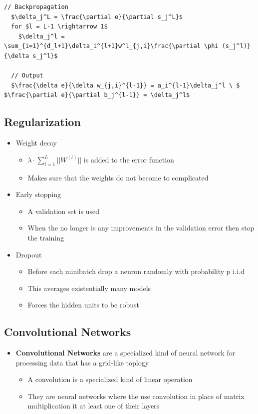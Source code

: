 \documentclass[a4, english]{article}
\begin{document}
\begin{itemize}
\begin{lstlisting}[mathescape=true]
  // Backpropagation 
  $\delta_j^L = \frac{\partial e}{\partial s_j^L}$
  for $l = L-1 \rightarrow 1$ 
    $\delta_j^l = \sum_{i=1}^{d_l+1}\delta_i^{l+1}w^l_{j,i}\frac{\partial \phi (s_j^l)}{\delta s_j^l}$
  
  // Output
  $\frac{\delta e}{\delta w_{j,i}^{l-1}} = a_i^{l-1}\delta_j^l \ $ $\frac{\partial e}{\partial b_j^{l-1}} = \delta_j^l$    
\end{lstlisting}
\end{itemize}

\subsection{Regularization}
\begin{itemize}
	\item Weight decay
  \begin{itemize}
  	\item $\lambda \cdot \sum_{l=1}^L ||W^{(l)}||$ is added to the error function
    \item Makes sure that the weights do not become to complicated  
  \end{itemize}
  \item Early stopping
  \begin{itemize}
  	\item A validation set is used
    \item When the no longer is any improvements in the validation error then stop the training
  \end{itemize}
  \item Dropout
  \begin{itemize}
  	\item Before each minibatch drop a neuron randomly with probability p i.i.d
    \item This averages existentially many models
    \item Forces the hidden units to be robust 
  \end{itemize}
\end{itemize}

\subsection{Convolutional Networks}
\begin{itemize}
	\item \textbf{Convolutional Networks} are a specialized kind of neural network for processing data that has a grid-like toplogy
  \begin{itemize}
  	\item A convolution is a specialized kind of linear operation
    \item They are neural networks where the use convolution in place of matrix multiplication it at least one of their layers 
  \end{itemize}  
\end{itemize}
  
\end{document}
